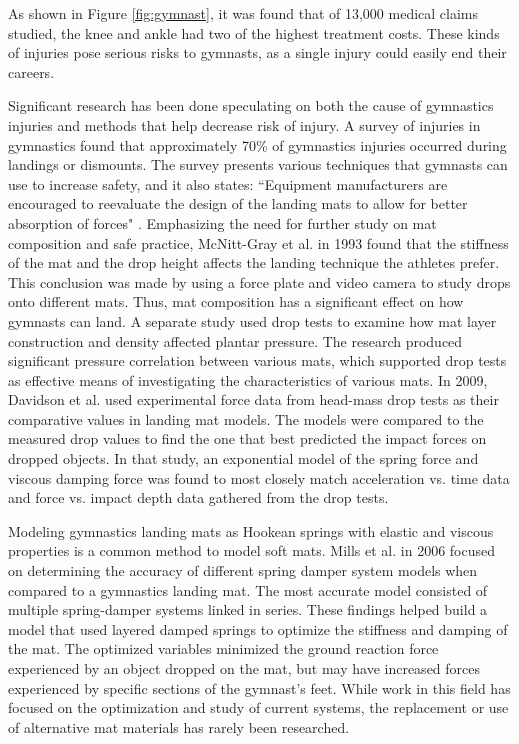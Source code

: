 \documentclass[12pt,aps,prb,preprint]{revtex4-1}   %
\begin{document}
As shown in Figure \ref{fig:gymnast}, it was found that of 13,000 medical claims studied, the knee and ankle had two of the highest treatment costs\cite{Bradshaw}. These kinds of injuries pose serious risks to gymnasts, as a single injury could easily end their careers.

Significant research has been done speculating on both the cause of gymnastics injuries and methods that help decrease risk of injury. A survey of injuries in gymnastics found that approximately 70\% of gymnastics injuries occurred during landings or dismounts. The survey presents various techniques that gymnasts can use to increase safety, and it also states: ``Equipment manufacturers are encouraged to reevaluate the design of the landing mats to allow for better absorption of forces" \cite{Marshall}. Emphasizing the need for further study on mat composition and safe practice, McNitt-Gray et al. in 1993 found that the stiffness of the mat and the drop height affects the landing technique the athletes prefer\cite{McNitt}. This conclusion was made by using a force plate and video camera to study drops onto different mats. Thus, mat composition has a significant effect on how gymnasts can land. A separate study used drop tests to examine how mat layer construction and density affected plantar pressure. The research produced significant pressure correlation between various mats, which supported drop tests as effective means of investigating the characteristics of various mats\cite{Perez}. In 2009, Davidson et al. used experimental force data from head-mass drop tests as their comparative values in landing mat models. The models were compared to the measured drop values to find the one that best predicted the impact forces on dropped objects. In that study, an exponential model of the spring force and viscous damping force was found to most closely match acceleration vs. time data and force vs. impact depth data gathered from the drop tests\cite{Davidson}. 

Modeling gymnastics landing mats as Hookean springs with elastic and viscous properties is a common method to model soft mats. Mills et al. in 2006 focused on determining the accuracy of different spring damper system models when compared to a gymnastics landing mat. The most accurate model consisted of multiple spring-damper systems linked in series\cite{Mills2006}. These findings helped build a model that used layered damped springs to optimize the stiffness and damping of the mat. The optimized variables minimized the ground reaction force experienced by an object dropped on the mat, but may have increased forces experienced by specific sections of the gymnast’s feet\cite{Mills2010}. While work in this field has focused on the optimization and study of current systems, the replacement or use of alternative mat materials has rarely been researched.
\end{document}
